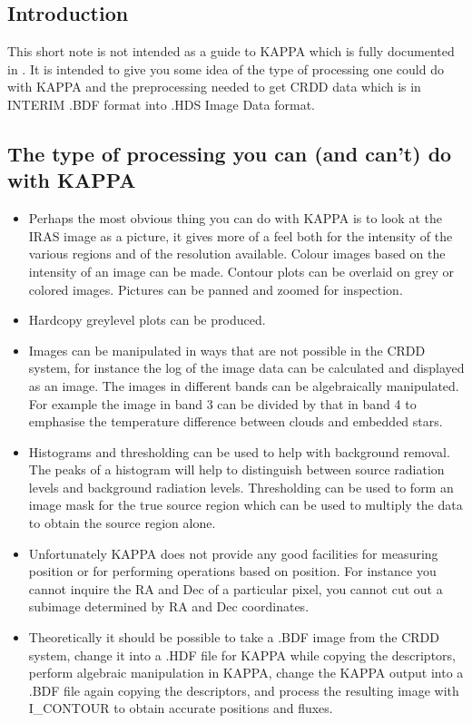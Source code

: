 \documentclass[nolof,noabs,11pt]{starlink}
\begin{document}
\subsection{Introduction}

This short note is not intended as a guide to KAPPA which is fully documented
in . It is intended to give you some idea of the type of processing one
could do with KAPPA and the preprocessing needed to get CRDD data which is in
INTERIM .BDF format into .HDS Image Data format.

\subsection{The type of processing you can (and can't) do with KAPPA}

\begin{itemize}
\item Perhaps the most obvious thing you can do with KAPPA is to look at the
IRAS image as a picture, it gives more of a feel both for the intensity of the
various regions and of the resolution available. Colour images based on the
intensity of an image can be made. Contour plots can be overlaid on grey or
colored images. Pictures can be panned and zoomed for inspection.
\item Hardcopy greylevel plots can be produced.
\item Images can be manipulated in ways that are not possible in the CRDD
system, for instance the log of the image data can be calculated and displayed
as an image. The images in different bands can be algebraically manipulated. For
example the image in band 3 can be divided by that in band 4 to emphasise the
temperature difference between clouds and embedded stars.
\item Histograms and thresholding can be used to help with background removal.
The peaks of a histogram will help to distinguish between source radiation
levels and background radiation levels. Thresholding can be used to form an
image mask for the true source region which can be used to multiply the data to
obtain the source region alone.
\item Unfortunately KAPPA does not provide any good facilities for measuring
position or for performing operations based on position. For instance you
cannot inquire the RA and Dec of a particular pixel, you cannot cut out a
subimage determined by RA and Dec coordinates.
\item Theoretically it should be possible to take a .BDF image from the CRDD
system, change it into a .HDF file for KAPPA while copying the descriptors,
perform algebraic manipulation in KAPPA, change the KAPPA output into a .BDF
file again copying the descriptors, and process the resulting image with
I\_CONTOUR to obtain accurate positions and fluxes.
\end{itemize}
\end{document}
